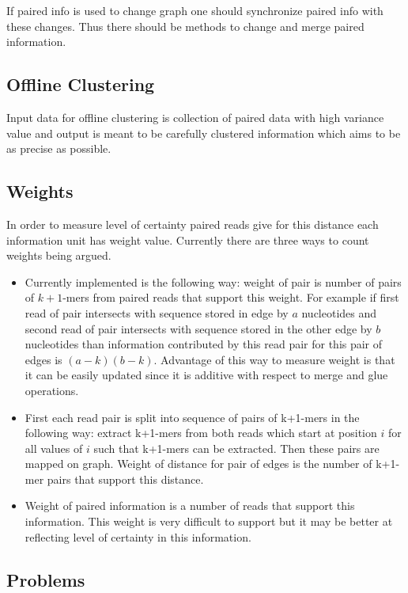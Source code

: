 \documentclass[14pt]{article}
\begin{document}
If paired info is used to change graph one should synchronize paired info with these changes. Thus there should be methods to change and merge paired information.

\subsection{Offline Clustering}

Input data for offline clustering is collection of paired data with high variance value and output is meant to be carefully clustered information which aims to be as precise as possible.

\subsection{Weights}
In order to measure level of certainty paired reads give for this distance each information unit has weight value. Currently there are three ways to count weights being argued.

\begin{itemize}
\item Currently implemented is the following way: weight of pair is number of pairs of $k+1$-mers from paired reads that support this weight. For example if first read of pair intersects with sequence stored in edge by $a$ nucleotides and second read of pair intersects with sequence stored in the other edge by $b$ nucleotides than information contributed by this read pair for this pair of edges is $(a - k)(b - k)$. Advantage of this way to measure weight is that it can be easily updated since it is additive with respect to merge and glue operations.
\item First each read pair is split into sequence of pairs of k+1-mers in the following way: extract k+1-mers from both reads which start at position $i$ for all values of $i$ such that k+1-mers can be extracted. Then these pairs are mapped on graph. Weight of distance for pair of edges is the number of k+1-mer pairs that support this distance.
\item Weight of paired information is a number of reads that support this information. This weight is very difficult to support but it may be better at reflecting level of certainty in this information.
\end{itemize}

\subsection{Problems}
\end{document}
